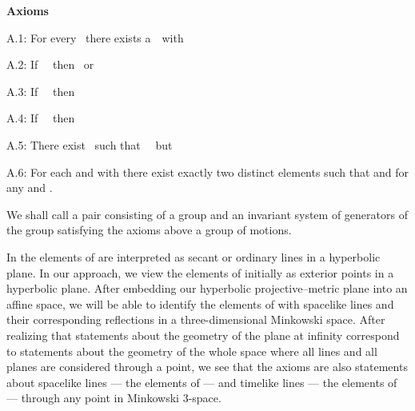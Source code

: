 \documentclass[a4paper,twoside,12pt]{article}
\def\nind{\noindent}
\begin{document}
\medskip

\noindent \textbf{Axioms}

A.1: For every \coordHE{}\ there exists a\ \coordHE{}\ with \coordHE{}\ \coordHE{}

A.2: If \coordHE{}\ \coordHE{}\ then \coordHE{}\ or \coordHE{}

A.3: If \coordHE{}\ \coordHE{}\ then \coordHE{}

A.4: If \coordHE{}\ \coordHE{}\ then \coordHE{}

A.5: There exist \coordHE{}\ such that \coordHE{}\ \coordHE{}\ but \coordHE{}

A.6: For each \coordHE{} and \coordHE{} with \coordHE{} there exist exactly two
distinct elements \coordHE{} such that 
\coordHE{} and \coordHE{} for any \coordHE{} and \coordHE{}.   

\medskip

\nind We shall call a pair \coordHE{}
consisting of a group \coordHE{} and an invariant system
\coordHE{} of generators of the group \coordHE{} satisfying the
axioms above a group of motions.

     In \cite{BBPW} the elements of \coordHE{} are interpreted as
secant or ordinary lines in a hyperbolic plane. In our approach, we
view the elements of \coordHE{} initially as exterior points in a
hyperbolic plane. After embedding our hyperbolic projective--metric
plane into an affine space, we will be able to identify the elements
of \coordHE{} with spacelike lines and their corresponding
reflections in a three-dimensional Minkowski space. After realizing
that statements about the geometry of the plane at infinity correspond
to statements about the geometry of the whole space where all lines
and all planes are considered through a point, we see that the axioms
are also statements about spacelike lines --- the elements of
\coordHE{} --- and timelike lines --- the elements \coordHE{} of
\coordHE{} --- through any point in Minkowski 3-space.
\end{document}
